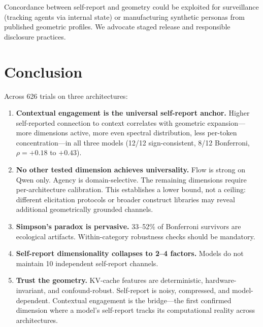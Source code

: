 \documentclass[11pt,a4paper]{article}
\begin{document}
Concordance between self-report and geometry could be exploited for surveillance (tracking agents via internal state) or manufacturing synthetic personas from published geometric profiles. We advocate staged release and responsible disclosure practices.

\section{Conclusion}

Across 626 trials on three architectures:

\begin{enumerate}[nosep]
    \item \textbf{Contextual engagement is the universal self-report anchor.} Higher self-reported connection to context correlates with geometric expansion---more dimensions active, more even spectral distribution, less per-token concentration---in all three models (12/12 sign-consistent, 8/12 Bonferroni, $\rho = +0.18$ to $+0.43$).

    \item \textbf{No other tested dimension achieves universality.} Flow is strong on Qwen only. Agency is domain-selective. The remaining dimensions require per-architecture calibration. This establishes a lower bound, not a ceiling: different elicitation protocols or broader construct libraries may reveal additional geometrically grounded channels.

    \item \textbf{Simpson's paradox is pervasive.} 33--52\% of Bonferroni survivors are ecological artifacts. Within-category robustness checks should be mandatory.

    \item \textbf{Self-report dimensionality collapses to 2--4 factors.} Models do not maintain 10 independent self-report channels.

    \item \textbf{Trust the geometry.} KV-cache features are deterministic, hardware-invariant, and confound-robust. Self-report is noisy, compressed, and model-dependent. Contextual engagement is the bridge---the first confirmed dimension where a model's self-report tracks its computational reality across architectures.
\end{enumerate}
\end{document}

